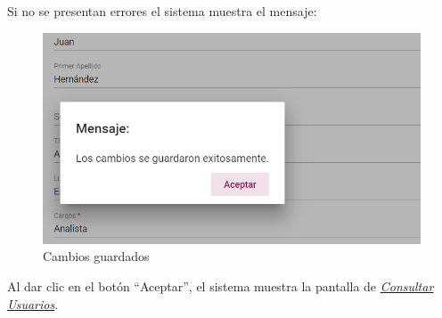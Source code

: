 Si no se presentan errores el sistema muestra el mensaje:

\begin{figure}[H]
	\centering
	\includegraphics[width=0.4\linewidth]{images/SP5/MSG31}
	\caption{Cambios guardados}
	\label{mensaje31}
	
\end{figure}

Al dar clic en el botón “Aceptar”, el sistema muestra la pantalla de \hyperlink{consultarUs}{\textit{Consultar Usuarios}}.

